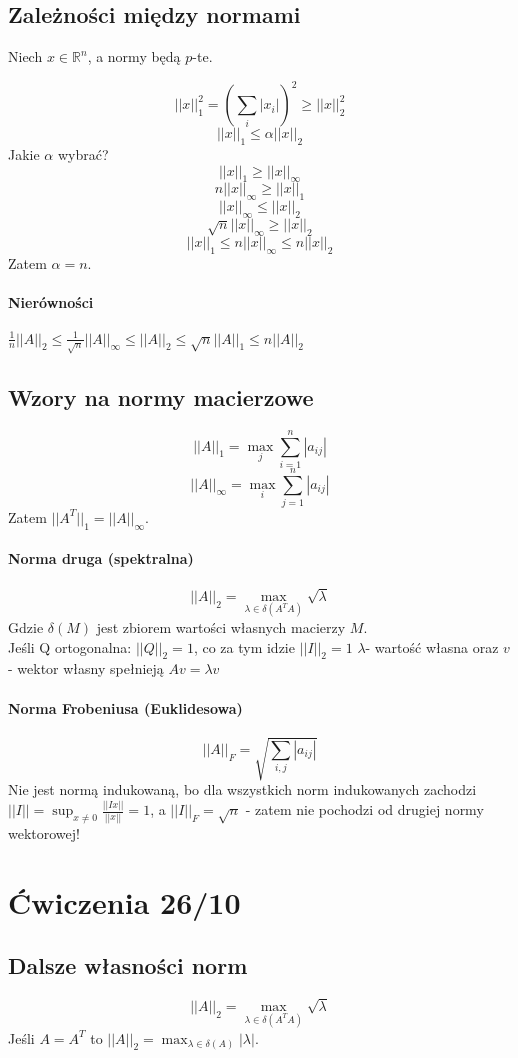 \documentclass{article}
\begin{document}
\subsection{Zależności między normami}
Niech $ x\in\mathbb{R}^n $, a normy będą $p$-te.

$$ ||x||^2_1=(\sum_i|x_i|)^2 \ge ||x||_2^2$$
$$ ||x||_1\le \alpha||x||_2 $$
Jakie $\alpha$ wybrać?
$$ ||x||_1\ge ||x||_\infty $$
$$ n||x||_\infty\ge ||x||_1 $$
$$ ||x||_\infty\le ||x||_2 $$
$$ \sqrt n||x||_\infty\ge ||x||_2 $$
$$ ||x||_1\leq n||x||_\infty\leq n||x||_2 $$
Zatem $\alpha=n$.
\paragraph{Nierówności}
$ \frac1n ||A||_2\le\frac1{\sqrt n}||A||_\infty\le||A||_2\le\sqrt{n} ||A||_1\le n||A||_2$
\subsection{Wzory na normy macierzowe}
$$ ||A||_1=\max_j\sum_{i=1}^{n} |a_{ij}|$$
$$ ||A||_\infty=\max_i\sum_{j=1}^{n} |a_{ij}|$$
Zatem $ ||A^T||_1=||A||_\infty $.\\
\paragraph{Norma druga (spektralna)}
$$||A||_2=\max_{\lambda\in\delta(A^TA)}\sqrt{\lambda}$$
Gdzie $ \delta(M) $ jest zbiorem wartości własnych macierzy $ M $.\\
Jeśli Q ortogonalna: $||Q||_2=1$, co za tym idzie $ ||I||_2=1 $
$ \lambda $- wartość własna oraz $ v $ - wektor własny spełnieją $ Av=\lambda v $
\paragraph{Norma Frobeniusa (Euklidesowa)}
$$ ||A||_F = \sqrt{\sum_{i,j}|a_{ij}|} $$
Nie jest normą indukowaną, bo dla wszystkich norm indukowanych zachodzi $ ||I||=\sup_{x\not=0}\frac{||Ix||}{||x||}=1 $, a
$ ||I||_F=\sqrt{n} $ - zatem nie pochodzi od drugiej normy wektorowej!

\section{Ćwiczenia 26/10}
\subsection{Dalsze własności norm}
$$ ||A||_2=\max_{\lambda\in\delta(A^TA)}\sqrt{\lambda} $$
Jeśli $ A=A^T $ to $ ||A||_2=\max_{\lambda\in\delta(A)}|\lambda| $. 
\end{document}
